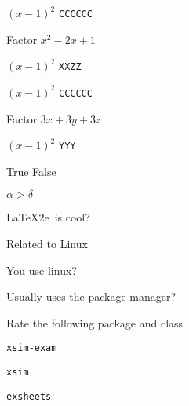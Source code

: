 \documentclass{article}
\begin{document}
    \begin{scontents}[store-env=simplews]
    $\left(x-1\right)^{2}$ \verb+CCCCCC+
    \end{scontents}


\begin{enumext}[save-ans=simplews,columns=2,check-ans=true,show-ans=true,nosep,save-ref=true,wrap-label={\tikz[scale=0.25]\duck[signpost=\scalebox{0.6}{#1}];}]
  \item Factor $x^{2}-2x+1$
    \begin{anskey*}
    $\left(x-1\right)^{2}$ \verb+XXZZ+
    \end{anskey*}

            \begin{scontents}[store-env=simple,print-env=true]
          $\left(x-1\right)^{2}$ \verb+CCCCCC+
        \end{scontents}

  \item Factor $3x+3y+3z$
    \begin{anskey*}
    $\left(x-1\right)^{2}$ \verb+YYY+
    \end{anskey*}
  \item True False
    \begin{enumext}[nosep]
      \item $\alpha > \delta$ 
      \item \LaTeX2e\ is cool? 
    \end{enumext}
  \item Related to Linux
    \begin{enumext}[nosep]
      \item You use linux? 
      \item Usually uses the package manager? 
      \item Rate the following package and class
        \begin{enumext}[nosep]
          \item \texttt{xsim-exam} 
          \item \texttt{xsim} 
          \item \texttt{exsheets} 
        \end{enumext}
    \end{enumext}
\end{enumext}
\end{document}
